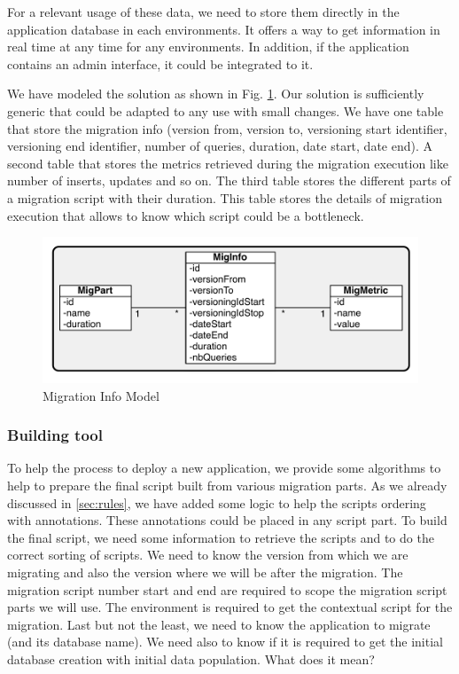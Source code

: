 For a relevant usage of these data, we need to store them directly in the application database in each environments. It offers a way to get information in real time at any time for any environments. In addition, if the application contains an admin interface, it could be integrated to it.

We have modeled the solution as shown in Fig. \ref{fig:migInfo}. Our solution is sufficiently generic that could be adapted to any use with small changes. We have one table that store the migration info (version from, version to, versioning start identifier, versioning end identifier, number of queries, duration, date start, date end). A second table that stores the metrics retrieved during the migration execution like number of inserts, updates and so on. The third table stores the different parts of a migration script with their duration. This table stores the details of migration execution that allows to know which script could be a bottleneck.

\begin{figure}[h]
        \centering
        \includegraphics[scale=0.80]{images/MigrationInfo.pdf}
        \caption{Migration Info Model}
        \label{fig:migInfo}
\end{figure}

\subsubsection{Building tool\\}
	\label{sec:buildingScript}

To help the process to deploy a new application, we provide some algorithms to help to prepare the final script built from various migration parts. As we already discussed in \autoref{sec:rules}, we have added some logic to help the scripts ordering with annotations. These annotations could be placed in any script part. To build the final script, we need some information to retrieve the scripts and to do the correct sorting of scripts. We need to know the version from which we are migrating and also the version where we will be after the migration. The migration script number start and end are required to scope the migration script parts we will use. The environment is required to get the contextual script for the migration. Last but not the least, we need to know the application to migrate (and its database name). We need also to know if it is required to get the initial database creation with initial data population. What does it mean?

